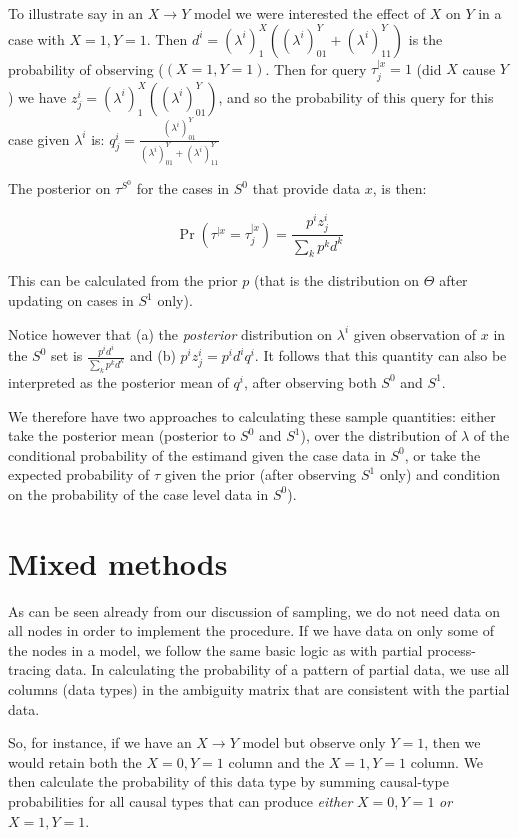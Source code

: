 \documentclass[
  12pt,
]{book}
\begin{document}
To illustrate say in an \(X\rightarrow Y\) model we were interested the effect of \(X\) on \(Y\) in a case with \(X=1, Y=1\). Then \(d^i = (\lambda^i)^X_1((\lambda^i)^Y_{01} + (\lambda^i)^Y_{11})\) is the probability of observing (\((X=1, Y=1)\). Then for query \(\tau^{|x}_j = 1\) (did \(X\) cause \(Y\)) we have \(z^i_j = (\lambda^i)^X_1((\lambda^i)^Y_{01})\), and so the probability of this query for this case given \(\lambda^i\) is: \(q^i_j = \frac{(\lambda^i)^Y_{01}}{(\lambda^i)^Y_{01} + (\lambda^i)^Y_{11}}\)

The posterior on \(\tau^{S^0}\) for the cases in \(S^0\) that provide data \(x\), is then:

\[\Pr(\tau^{|x} = \tau_j^{|x}) = \frac{p^iz^i_j}{\sum_k p^kd^k}\]

This can be calculated from the prior \(p\) (that is the distribution on \(\Theta\) after updating on cases in \(S^1\) only).

Notice however that (a) the \emph{posterior} distribution on \(\lambda^i\) given observation of \(x\) in the \(S^0\) set is \(\frac{p^id^i}{\sum_k p^kd^k}\) and (b) \(p^iz^i_j = p^id^iq^i\). It follows that this quantity can also be interpreted as the posterior mean of \(q^i\), after observing both \(S^0\) and \(S^1\).

We therefore have two approaches to calculating these sample quantities: either take the posterior mean (posterior to \(S^0\) and \(S^1\)), over the distribution of \(\lambda\) of the conditional probability of the estimand given the case data in \(S^0\), or take the expected probability of \(\tau\) given the prior (after observing \(S^1\) only) and condition on the probability of the case level data in \(S^0\)).

\hypertarget{mixed-methods}{%
\section{Mixed methods}\label{mixed-methods}}

As can be seen already from our discussion of sampling, we do not need data on all nodes in order to implement the procedure. If we have data on only some of the nodes in a model, we follow the same basic logic as with partial process-tracing data. In calculating the probability of a pattern of partial data, we use all columns (data types) in the ambiguity matrix that are consistent with the partial data.

So, for instance, if we have an \(X \rightarrow Y\) model but observe only \(Y=1\), then we would retain both the \(X=0, Y=1\) column and the \(X=1, Y=1\) column. We then calculate the probability of this data type by summing causal-type probabilities for all causal types that can produce \emph{either} \(X=0, Y=1\) \emph{or} \(X=1, Y=1\).
\end{document}
